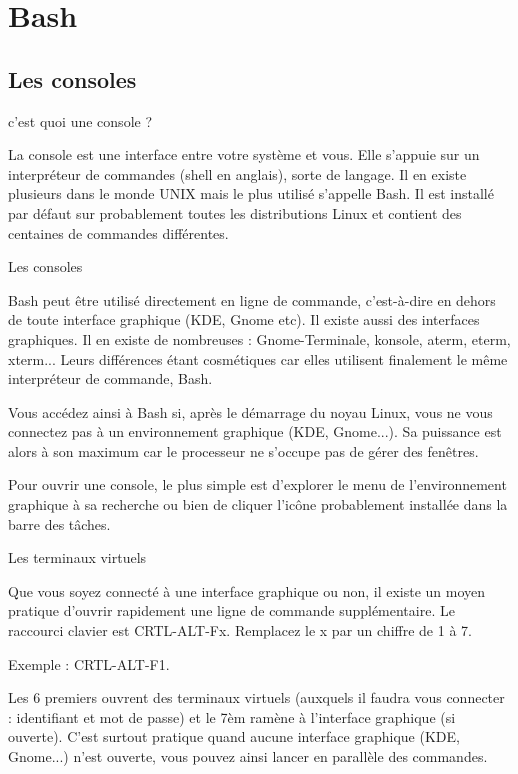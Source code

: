 \documentclass[10pt]{beamer}
\begin{document}
\section{Bash}
\subsection{Les consoles}
\begin{frame}[fragile]{c'est quoi une console ?}

La console est une interface entre votre système et vous. Elle s'appuie sur un
interpréteur de commandes (shell en anglais), sorte de langage. Il en existe
plusieurs dans le monde UNIX mais le plus utilisé s'appelle Bash. Il est installé par
défaut sur probablement toutes les distributions Linux et contient des centaines de
commandes différentes.

\end{frame}


\begin{frame}[fragile]{Les consoles}

Bash peut être utilisé directement en ligne de commande, c'est-à-dire en dehors de
toute interface graphique (KDE, Gnome etc). Il existe aussi des interfaces graphiques. Il en existe de nombreuses : Gnome-Terminale, konsole, aterm, eterm, xterm... Leurs différences étant cosmétiques car elles utilisent finalement le même interpréteur de commande, Bash.

Vous accédez ainsi à Bash si, après le démarrage du noyau Linux, vous ne vous connectez pas à un environnement graphique (KDE, Gnome...). Sa puissance est alors à son maximum car le processeur ne s'occupe pas de gérer des fenêtres. 

Pour ouvrir une console, le plus simple est d'explorer le menu de l'environnement graphique à sa recherche ou bien de cliquer l'icône probablement installée dans la barre des tâches.
\end{frame}


\begin{frame}{Les terminaux virtuels}

Que vous soyez connecté à une interface graphique ou non, il existe un moyen
pratique d'ouvrir rapidement une ligne de commande supplémentaire. Le raccourci
clavier est CRTL-ALT-Fx. Remplacez le x par un chiffre de 1 à 7.

Exemple : \alert{CRTL-ALT-F1}. 

Les 6 premiers ouvrent des terminaux virtuels (auxquels il faudra vous connecter : identifiant et mot de passe) et le 7èm ramène à l'interface graphique (si ouverte). C'est surtout pratique quand aucune interface graphique (KDE, Gnome...) n'est ouverte, vous pouvez ainsi lancer en parallèle des commandes.
\end{frame}
\end{document}

